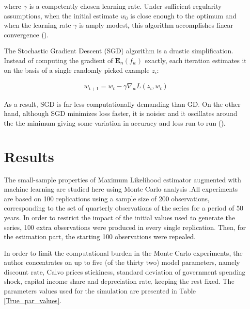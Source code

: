 \documentclass{pracamgr}
\numberwithin{equation}{section}
\begin{document}
where $\gamma$ is a competently chosen learning rate. Under sufficient regularity assumptions, when the initial estimate $w_{0}$ is close enough to the optimum and when the learning rate $\gamma$ is amply modest, this algorithm accomplishes linear convergence (\citet{dennis1996numerical}).

The Stochastic Gradient Descent (SGD) algorithm is a drastic simplification. Instead of computing the gradient of $\mathbf{E}_{n} (f_{w})$ exactly, each iteration estimates it on the basis of a single randomly picked example $z_{i}$:

\begin{align}
w_{t+1} = w_{t} - \gamma \nabla_{w} L(z_{i}, w_{t})
\end{align}

As a result, SGD is far less computationally demanding than GD. On the other hand, although SGD minimizes loss faster, it is noisier and it oscillates around the the minimum giving some variation in accuracy and loss run to run (\citet{bottou2012stochastic}).

\chapter{Results}

The small-sample properties of Maximum Likelihood estimator augmented with machine learning are studied here using Monte Carlo analysis .All experiments are based on 100 replications using a sample size of 200 observations, corresponding to the set of quarterly observations of the series for a period of 50 years. In order to restrict the impact of the initial values used to generate the series, 100 extra observations were produced in every single replication. Then, for the estimation part, the starting 100 observations were repealed.

In order to limit the computational burden in the Monte Carlo experiments, the author concentrates on up to five (of the thirty two) model parameters, namely discount rate, Calvo prices stickiness, standard deviation of government spending shock, capital income share and depreciation rate, keeping the rest fixed. The parameters values used for the simulation are presented in Table \ref{True_par_values}.

\newpage
\end{document}
